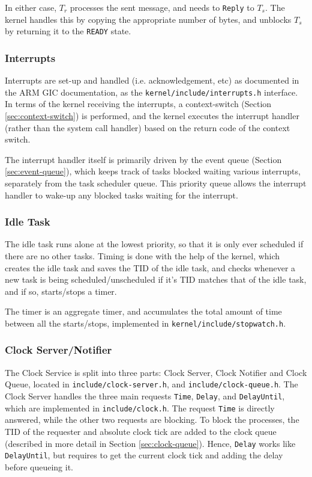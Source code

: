 \documentclass[12pt, titlepage]{article}
\begin{document}
    In either case, $T_r$ processes the sent message, and needs to \verb`Reply` to $T_s$. The kernel handles this by copying the appropriate number of bytes, and unblocks $T_s$ by returning it to the \verb`READY` state.
    
    \subsubsection{Interrupts}
    \label{sec:interrupt}
    Interrupts are set-up and handled (i.e. acknowledgement, etc) as documented in the ARM GIC documentation, as the \verb`kernel/include/interrupts.h` interface. In terms of the kernel receiving the interrupts, a context-switch (Section \ref{sec:context-switch}) is performed, and the kernel executes the interrupt handler (rather than the system call handler) based on the return code of the context switch.
    
    The interrupt handler itself is primarily driven by the event queue (Section \ref{sec:event-queue}), which keeps track of tasks blocked waiting various interrupts, separately from the task scheduler queue. This priority queue allows the interrupt handler to wake-up any blocked tasks waiting for the interrupt.
    
    \subsubsection{Idle Task}
    \label{sec:idle-task}
    The idle task runs alone at the lowest priority, so that it is only ever scheduled if there are no other tasks. Timing is done with the help of the kernel, which creates the idle task and saves the TID of the idle task, and checks whenever a new task is being scheduled/unscheduled if it's TID matches that of the idle task, and if so, starts/stops a timer.
    
    The timer is an aggregate timer, and accumulates the total amount of time between all the starts/stops, implemented in \verb`kernel/include/stopwatch.h`.
    
    \subsubsection{Clock Server/Notifier}
    The Clock Service is split into three parts: Clock Server, Clock Notifier and Clock Queue, located in \verb`include/clock-server.h`, and \verb`include/clock-queue.h`. 
    The Clock Server handles the three main requests \verb`Time`, \verb`Delay`, and \verb`DelayUntil`, which are implemented in \verb`include/clock.h`.
    The request \verb`Time` is directly answered, while the other two requests are blocking. 
    To block the processes, the TID of the requester and absolute clock tick are added to the clock queue (described in more detail in Section \ref{sec:clock-queue}). 
    Hence, \verb`Delay` works like \verb`DelayUntil`, but requires to get the current clock tick and adding the delay before queueing it. 
\end{document}
